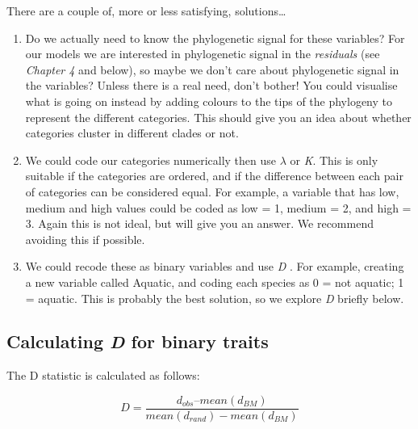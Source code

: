 \documentclass[]{book}
\begin{document}
There are a couple of, more or less satisfying, solutions\ldots{}

\begin{enumerate}
\def\labelenumi{\arabic{enumi}.}
\item
  Do we actually need to know the phylogenetic signal for these
  variables? For our models we are interested in phylogenetic signal in
  the \emph{residuals} (see \emph{Chapter 4} and below), so maybe we
  don't care about phylogenetic signal in the variables? Unless there is
  a real need, don't bother! You could visualise what is going on
  instead by adding colours to the tips of the phylogeny to represent
  the different categories. This should give you an idea about whether
  categories cluster in different clades or not.
\item
  We could code our categories numerically then use \(\lambda\) or
  \emph{K}. This is only suitable if the categories are ordered, and if
  the difference between each pair of categories can be considered
  equal. For example, a variable that has low, medium and high values
  could be coded as low = 1, medium = 2, and high = 3. Again this is not
  ideal, but will give you an answer. We recommend avoiding this if
  possible.
\item
  We could recode these as binary variables and use \emph{D}
  \citep{fritz2010selectivity}. For example, creating a new variable
  called Aquatic, and coding each species as 0 = not aquatic; 1 =
  aquatic. This is probably the best solution, so we explore \emph{D}
  briefly below.
\end{enumerate}

\subsection{\texorpdfstring{Calculating \emph{D} for binary
traits}{Calculating D for binary traits}}\label{calculating-d-for-binary-traits}

The D statistic \citep{fritz2010selectivity} is calculated as follows:

\begin{equation}
D = \frac{d_{obs} – mean(d_{BM})}{mean(d_{rand}) - mean(d_{BM})}
\end{equation}
\end{document}
